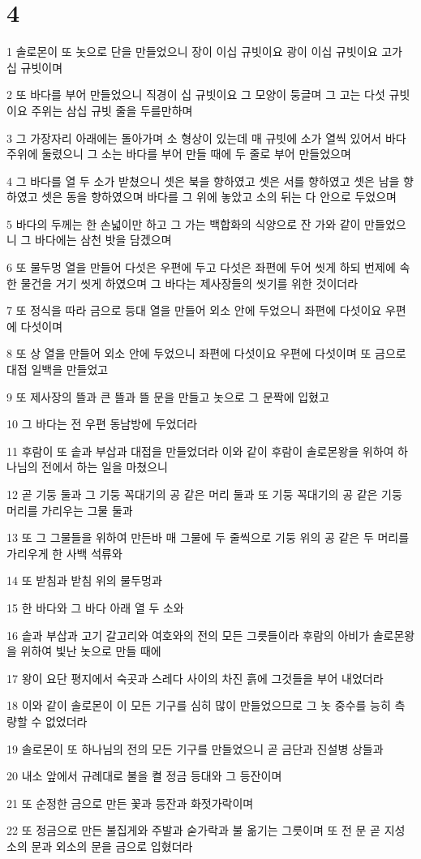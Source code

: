 \chapter{4}

\par 1 솔로몬이 또 놋으로 단을 만들었으니 장이 이십 규빗이요 광이 이십 규빗이요 고가 십 규빗이며
\par 2 또 바다를 부어 만들었으니 직경이 십 규빗이요 그 모양이 둥글며 그 고는 다섯 규빗이요 주위는 삼십 규빗 줄을 두를만하며
\par 3 그 가장자리 아래에는 돌아가며 소 형상이 있는데 매 규빗에 소가 열씩 있어서 바다 주위에 둘렸으니 그 소는 바다를 부어 만들 때에 두 줄로 부어 만들었으며
\par 4 그 바다를 열 두 소가 받쳤으니 셋은 북을 향하였고 셋은 서를 향하였고 셋은 남을 향하였고 셋은 동을 향하였으며 바다를 그 위에 놓았고 소의 뒤는 다 안으로 두었으며
\par 5 바다의 두께는 한 손넓이만 하고 그 가는 백합화의 식양으로 잔 가와 같이 만들었으니 그 바다에는 삼천 밧을 담겠으며
\par 6 또 물두멍 열을 만들어 다섯은 우편에 두고 다섯은 좌편에 두어 씻게 하되 번제에 속한 물건을 거기 씻게 하였으며 그 바다는 제사장들의 씻기를 위한 것이더라
\par 7 또 정식을 따라 금으로 등대 열을 만들어 외소 안에 두었으니 좌편에 다섯이요 우편에 다섯이며
\par 8 또 상 열을 만들어 외소 안에 두었으니 좌편에 다섯이요 우편에 다섯이며 또 금으로 대접 일백을 만들었고
\par 9 또 제사장의 뜰과 큰 뜰과 뜰 문을 만들고 놋으로 그 문짝에 입혔고
\par 10 그 바다는 전 우편 동남방에 두었더라
\par 11 후람이 또 솥과 부삽과 대접을 만들었더라 이와 같이 후람이 솔로몬왕을 위하여 하나님의 전에서 하는 일을 마쳤으니
\par 12 곧 기둥 둘과 그 기둥 꼭대기의 공 같은 머리 둘과 또 기둥 꼭대기의 공 같은 기둥 머리를 가리우는 그물 둘과
\par 13 또 그 그물들을 위하여 만든바 매 그물에 두 줄씩으로 기둥 위의 공 같은 두 머리를 가리우게 한 사백 석류와
\par 14 또 받침과 받침 위의 물두멍과
\par 15 한 바다와 그 바다 아래 열 두 소와
\par 16 솥과 부삽과 고기 갈고리와 여호와의 전의 모든 그릇들이라 후람의 아비가 솔로몬왕을 위하여 빛난 놋으로 만들 때에
\par 17 왕이 요단 평지에서 숙곳과 스레다 사이의 차진 흙에 그것들을 부어 내었더라
\par 18 이와 같이 솔로몬이 이 모든 기구를 심히 많이 만들었으므로 그 놋 중수를 능히 측량할 수 없었더라
\par 19 솔로몬이 또 하나님의 전의 모든 기구를 만들었으니 곧 금단과 진설병 상들과
\par 20 내소 앞에서 규례대로 불을 켤 정금 등대와 그 등잔이며
\par 21 또 순정한 금으로 만든 꽃과 등잔과 화젓가락이며
\par 22 또 정금으로 만든 불집게와 주발과 숟가락과 불 옮기는 그릇이며 또 전 문 곧 지성소의 문과 외소의 문을 금으로 입혔더라

